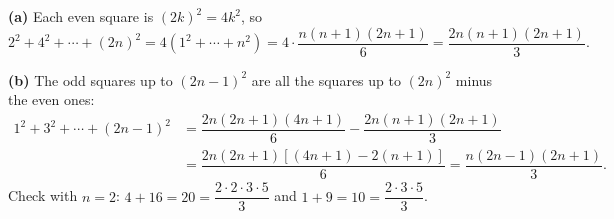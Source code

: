 \textbf{(a)} Each even square is $(2k)^2=4k^2$, so
\[2^2+4^2+\cdots+(2n)^2=4\left(1^2+\cdots+n^2\right)=4\cdot\dfrac{n(n+1)(2n+1)}{6}=\boxed{\dfrac{2n(n+1)(2n+1)}{3}}.\]

\textbf{(b)} The odd squares up to $(2n-1)^2$ are all the squares up to $(2n)^2$ minus the even ones:
\begin{align*}
1^2+3^2+\cdots+(2n-1)^2&=\dfrac{2n(2n+1)(4n+1)}{6}-\dfrac{2n(n+1)(2n+1)}{3}\\
&=\dfrac{2n(2n+1)\left[(4n+1)-2(n+1)\right]}{6}=\boxed{\dfrac{n(2n-1)(2n+1)}{3}}.
\end{align*}
Check with $n=2$: $4+16=20=\dfrac{2\cdot2\cdot3\cdot5}{3}$ and $1+9=10=\dfrac{2\cdot3\cdot5}{3}$.
